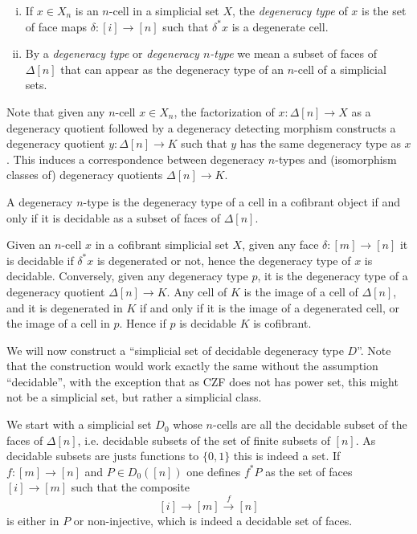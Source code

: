\documentclass[reqno,10pt,a4paper,oneside]{amsart}
\makeatletter
\renewenvironment{proof}[1][\proofname] {\par\pushQED{\qed}\normalfont\topsep6\p@\@plus6\p@\relax\trivlist\item[\hskip\labelsep\bf#1\@addpunct{.}]\ignorespaces}{\popQED\endtrivlist\@endpefalse}
\numberwithin{equation}{section}
\theoremstyle{mythm}
\theoremstyle{mydef}
\theoremstyle{myrmk}
\newcommand{\co}{\colon}
\makeatother
\begin{document}
\begin{definition}\hfill
\begin{enumerate}[(i)]  
\item If $x \in X_n$ is an $n$-cell in a simplicial set $X$, the \emph{degeneracy type} of $x$ is the set of face maps $\delta:[i] \rightarrow [n]$ such that $\delta^* x$ is a degenerate cell.
\item By a \emph{degeneracy type} or \emph{degeneracy $n$-type} we mean a subset of faces of $\Delta[n]$ that can appear as the degeneracy type of an $n$-cell of a simplicial sets.
\end{enumerate}
\end{definition}

\medskip

Note that given any $n$-cell $x \in X_n$, the factorization of $x \co \Delta[n] \rightarrow X$ as a degeneracy quotient followed by a degeneracy detecting morphism constructs a degeneracy quotient $y \co \Delta[n] \rightarrow K$ such that $y$ has the same degeneracy type as $x$. This induces a correspondence between degeneracy $n$-types and (isomorphism classes of) degeneracy quotients $\Delta[n] \rightarrow K$. 

\begin{lemma} A degeneracy $n$-type is the degeneracy type of a cell in a cofibrant object  if and only if it is decidable as a subset of faces of $\Delta[n]$.
\end{lemma}


\begin{proof}
Given an $n$-cell $x$ in a cofibrant simplicial set $X$, given any face $\delta:[m] \rightarrow [n]$ it is decidable if $\delta^* x$ is degenerated or not, hence the degeneracy type of $x$ is decidable. Conversely, given any degeneracy type $p$, it is the degeneracy type of a degeneracy quotient $\Delta[n] \rightarrow K$. Any cell of $K$ is the image of a cell of $\Delta[n]$, and it is degenerated in $K$ if and only if it is the image of a degenerated cell, or the image of a cell in $p$. Hence if $p$ is decidable $K$ is cofibrant.
\end{proof}


We will now construct a ``simplicial set of decidable degeneracy type $D$''. Note that the construction would work exactly the same without the assumption ``decidable'', with the exception that as CZF does not has power set, this might not be a simplicial set, but rather a simplicial class.


 We start with a simplicial set $D_0$ whose $n$-cells are all the decidable subset of the faces of $\Delta[n]$, i.e. decidable subsets of the set of finite subsets of $[n]$. As decidable subsets are justs functions to $\{0,1\}$ this is indeed a set.  If $f : [m] \rightarrow [n]$ and $P \in D_0([n])$ one defines $f^* P$ as the set of faces  $[i] \rightarrow [m]$ such that the composite 
 \[
 [i] \rightarrow [m] \overset{f}{\rightarrow} [n]
 \] is either in $P$ or non-injective, which is indeed a decidable set of faces.
\end{document}
